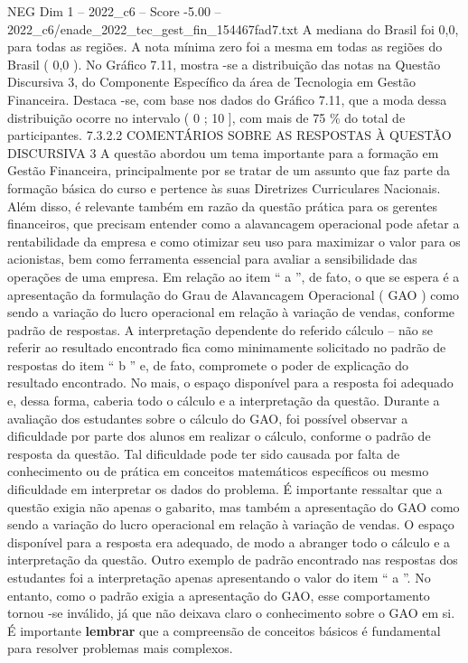 \begin{textsample}{NEG Dim 1 – 2022\_c6 – Score -5.00 – 2022\_c6/enade\_2022\_tec\_gest\_fin\_154467fad7.txt}
A mediana do Brasil foi 0,0, para todas as regiões.
A nota mínima zero foi a mesma em todas as regiões do Brasil ( 0,0 ).
No Gráfico 7.11, mostra -se a distribuição das notas na Questão Discursiva 3, do Componente Específico da área de Tecnologia em Gestão Financeira.
Destaca -se, com base nos dados do Gráfico 7.11, que a moda dessa distribuição ocorre no intervalo ( 0 ; 10 ], com mais de 75 \% do total de participantes. 7.3.2.2 COMENTÁRIOS SOBRE AS RESPOSTAS À QUESTÃO DISCURSIVA 3 A questão abordou um tema importante para a formação em Gestão Financeira, principalmente por se tratar de um assunto que faz parte da formação básica do curso e pertence às suas Diretrizes Curriculares Nacionais.
Além disso, é relevante também em razão da questão prática para os gerentes financeiros, que precisam entender como a alavancagem operacional pode afetar a rentabilidade da empresa e como otimizar seu uso para maximizar o valor para os acionistas, bem como ferramenta essencial para avaliar a sensibilidade das operações de uma empresa.
Em relação ao item “ a ”, de fato, o que se espera é a apresentação da formulação do Grau de Alavancagem Operacional ( GAO ) como sendo a variação do lucro operacional em relação à variação de vendas, conforme padrão de respostas.
A interpretação dependente do referido cálculo – não se referir ao resultado encontrado fica como minimamente solicitado no padrão de respostas do item “ b ” e, de fato, compromete o poder de explicação do resultado encontrado.
No mais, o espaço disponível para a resposta foi adequado e, dessa forma, caberia todo o cálculo e a interpretação da questão.
Durante a avaliação dos estudantes sobre o cálculo do GAO, foi possível observar a dificuldade por parte dos alunos em realizar o cálculo, conforme o padrão de resposta da questão.
Tal dificuldade pode ter sido causada por falta de conhecimento ou de prática em conceitos matemáticos específicos ou mesmo dificuldade em interpretar os dados do problema.
É importante ressaltar que a questão exigia não apenas o gabarito, mas também a apresentação do GAO como sendo a variação do lucro operacional em relação à variação de vendas.
O espaço disponível para a resposta era adequado, de modo a abranger todo o cálculo e a interpretação da questão.
Outro exemplo de padrão encontrado nas respostas dos estudantes foi a interpretação apenas apresentando o valor do item “ a ”.
No entanto, como o padrão exigia a apresentação do GAO, esse comportamento tornou -se inválido, já que não deixava claro o conhecimento sobre o GAO em si.
É importante \textbf{lembrar} que a compreensão de conceitos básicos é fundamental para resolver problemas mais complexos.

\end{textsample}
